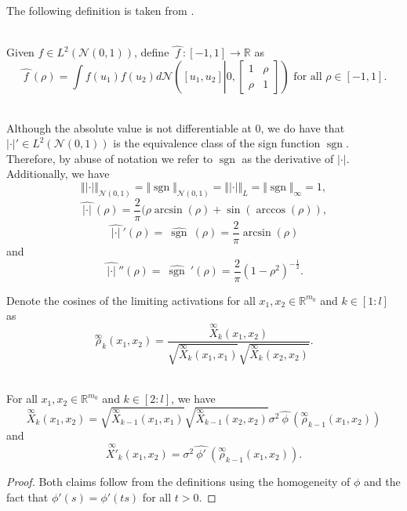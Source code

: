 \documentclass[twoside,11pt]{article}
\newcommand{\R}{\mathbb{R}}
\newcommand{\dual}[1]{\widehat{\ #1 \ }}
\newcommand{\limiting}[1]{\overset{\scriptscriptstyle\infty}{#1}}
\DeclareMathOperator{\sgn}{sgn}
\begin{document}
The following definition is taken from \citet{Danielyetal2016}.

\begin{definition}~\\
Given $f \in L^2(\mathcal{N}(0,1))$, define $\dual{f} : [-1,1] \to \R$ as
\[
\dual{f}(\rho) 
= \int f(u_1) f(u_2) d\mathcal{N}\left( [u_1,u_2] \left\vert 0,\left[ \begin{smallmatrix} 1 & \rho \\ \rho & 1 \end{smallmatrix} \right] \right. \right)\text{ for all } \rho \in [-1,1].
\]
\end{definition}

\begin{remark}[$\vert \cdot \vert$ and $\sgn$]\label{rem:abs_sgn_properties}~\\
Although the absolute value is not differentiable at $0$, we do have that $\vert \cdot \vert' \in L^2(\mathcal{N}(0,1))$ is the equivalence class of the sign function $\sgn$. Therefore, by abuse of notation we refer to $\sgn$ as the derivative of $\vert \cdot \vert$. Additionally, we have
\[
\Vert \vert \cdot \vert \Vert_{\mathcal{N}(0,1)} = \Vert \sgn \Vert_{\mathcal{N}(0,1)} = \Vert \vert \cdot \vert \Vert_L = \Vert \sgn \Vert_\infty = 1, 
\]
\[
\dual{\vert\cdot\vert}(\rho) = \frac{2}{\pi}(\rho\arcsin(\rho) + \sin(\arccos(\rho)),
\]
\[
\dual{\vert\cdot\vert}'(\rho) = \dual{\sgn}(\rho) = \frac{2}{\pi}\arcsin(\rho)
\]
and
\[
\dual{\vert\cdot\vert}''(\rho) = \dual{\sgn}'(\rho)=\frac{2}{\pi}(1-\rho^2)^{-\frac{1}{2}}.
\]
\end{remark}

Denote the cosines of the limiting activations for all $x_1,x_2 \in \R^{m_0}$ and $k \in [1:l]$ as
\[
\limiting{\rho}_k(x_1,x_2) = \frac{\limiting{X}_k(x_1,x_2)}{\sqrt{\limiting{X}_k(x_1,x_1)} \sqrt{\limiting{X}_k(x_2,x_2)}}.
\]

\begin{proposition}\label{prop:limiting_inner_products}~\\
For all $x_1, x_2 \in \R^{m_0}$ and $k \in [2:l]$, we have
\[
\limiting{X}_k(x_1,x_2)
= \sqrt{\limiting{X}_{k-1}(x_1,x_1)} \sqrt{\limiting{X}_{k-1}(x_2,x_2)} \sigma^2 \dual{\phi}\left( \limiting{\rho}_{k-1}(x_1,x_2) \right)
\]
and
\[
\limiting{X'}_k(x_1,x_2)
= \sigma^2 \dual{\phi'}\left( \limiting{\rho}_{k-1}(x_1,x_2) \right).
\]
\end{proposition}
\begin{proof}
Both claims follow from the definitions using the homogeneity of $\phi$ and the fact that $\phi'(s) = \phi'(ts)$ for all $t > 0$.
\end{proof}
\end{document}
